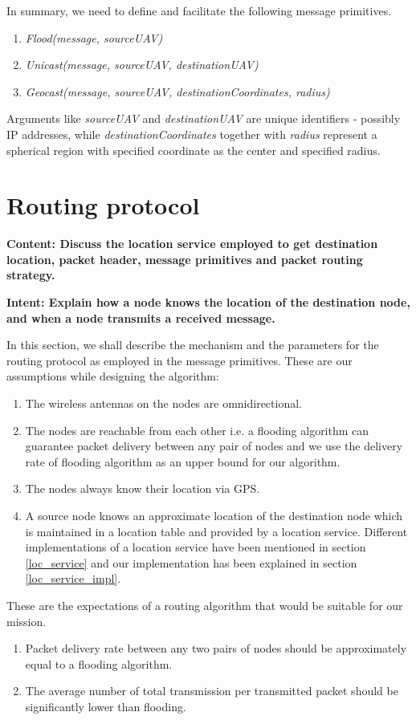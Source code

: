 In summary, we need to define and facilitate the following message primitives.
\begin{enumerate}
\item \emph{Flood(message, sourceUAV)}
\item \emph{Unicast(message, sourceUAV, destinationUAV)}
\item \emph{Geocast(message, sourceUAV, destinationCoordinates, radius)}
\end{enumerate}
Arguments like \emph{sourceUAV} and \emph{destinationUAV} are unique identifiers - possibly IP addresses, while \emph{destinationCoordinates} together with \emph{radius} represent a spherical region with specified coordinate as the center and specified radius.

\section{Routing protocol} \label{routing_protocol}

\textbf{Content: Discuss the location service employed to get destination location, packet header, message primitives and packet routing strategy.}

\textbf{Intent: Explain how a node knows the location of the destination node, and when a node transmits a received message.
}

In this section, we shall describe the mechanism and the parameters for the routing protocol as employed in the message primitives. 
These are our assumptions while designing the algorithm: 
\begin{enumerate}
\item The wireless antennas on the nodes are omnidirectional.
\item The nodes are reachable from each other i.e. a flooding algorithm can guarantee packet delivery between any pair of nodes and we use the delivery rate of flooding algorithm as an upper bound for our algorithm.
\item The nodes always know their location via GPS. 
\item A source node knows an approximate location of the destination node which is maintained in a location table and provided by a location service. Different implementations of a location service have been mentioned in section \ref{loc_service} and our implementation has been explained in section \ref{loc_service_impl}. 
\end{enumerate}

These are the expectations of a routing algorithm that would be suitable for our mission. 
\begin{enumerate}
\item Packet delivery rate between any two pairs of nodes should be approximately equal to a flooding algorithm. 
\item The average number of total transmission per transmitted packet should be significantly lower than flooding.
\end{enumerate}


